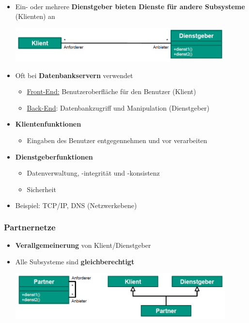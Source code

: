 			\begin{itemize}
				\item Ein- oder mehrere \textbf{Dienstgeber bieten Dienste für andere Subsysteme} (Klienten) an
				\begin{center}
					\includegraphics[width=0.9\textwidth]{../images/klientDienstgeber.png}
				\end{center}
				\item Oft bei \textbf{Datenbankservern} verwendet
				\begin{itemize}
					\item \underline{Front-End:} Benutzeroberfläche für den Benutzer (Klient)
					\item \underline{Back-End}: Datenbankzugriff und Manipulation (Dienstgeber)
				\end{itemize}
				\item \textbf{Klientenfunktionen}
				\begin{itemize}
					\item Eingaben des Benutzer entgegennehmen und vor verarbeiten
				\end{itemize}
				\item \textbf{Dienstgeberfunktionen}
				\begin{itemize}
					\item Datenverwaltung, -integrität und -konsistenz
					\item Sicherheit
				\end{itemize}		
				\item Beispiel: TCP/IP, DNS (Netzwerkebene)		
			\end{itemize}	
			
		\subsubsection{Partnernetze}
					
			\begin{itemize}
				\item \textbf{Verallgemeinerung} von Klient/Dienstgeber
				\item Alle Subsysteme sind \textbf{gleichberechtigt}
				\begin{center}
					\includegraphics[width=0.9\textwidth]{../images/partnernetze.png}
				\end{center}
			\end{itemize}
					
